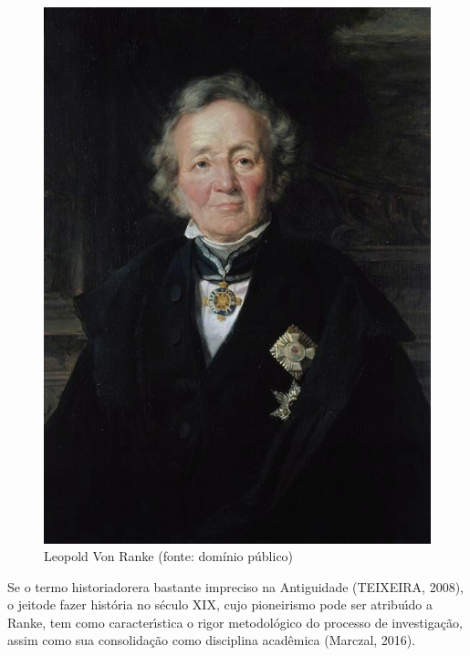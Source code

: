 \documentclass[
12pt,		%
openright,	%
twoside,  %
a4paper,			%
chapter=TITLE,		%
english,			%
french,				%
spanish,			%
brazil				%
]{USPSC-classe/USPSC}
\begin{document}
\captionsetup{format=plain}
\begin{figure}[max size={\textwidth}{\textheight}]

\centering


\begin{minipage}[b]{0.4\linewidth}
        \centering
                \includegraphics[width=1.0\linewidth]{../../imagens/ranke.jpg}
                \caption{Leopold Von Ranke (fonte: dom\'{i}nio p\'ublico)}
                \label{e978df58deaf86ca4da4073fca97b28afd4d3a3b}
\end{minipage}%
\hspace{0.5cm}
\end{figure}



Se o termo \textquotedbl historiador\textquotedbl  era bastante impreciso na Antiguidade (TEIXEIRA, 2008), o \textquotedbl jeito\textquotedbl  de fazer hist\'oria no s\'eculo XIX, cujo pioneirismo pode ser atribu\'{\i}do a Ranke, tem como caracter\'{\i}stica \textquotedbl o rigor metodol\'ogico do processo de investiga\c{c}\~ao\textquotedbl , assim como sua consolida\c{c}\~ao como disciplina acad\^emica (Marczal, 2016).
\end{document}

